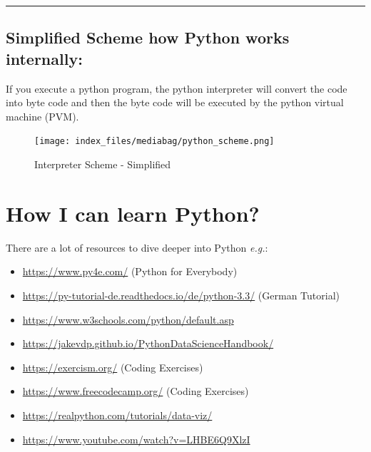 \documentclass[
  letterpaper,
  DIV=11,
  numbers=noendperiod]{scrreprt}
\providecommand{\tightlist}{%
  \setlength{\itemsep}{0pt}\setlength{\parskip}{0pt}}\usepackage{longtable,booktabs,array}
\begin{document}
\begin{center}\rule{0.5\linewidth}{0.5pt}\end{center}

\subsection*{Simplified Scheme how Python works
internally:}\label{simplified-scheme-how-python-works-internally}

If you execute a python program, the python interpreter will convert the
code into byte code and then the byte code will be executed by the
python virtual machine (PVM).

\begin{figure}[H]

{\centering \texttt{[image: index\_files/mediabag/python\_scheme.png]}

}

\caption{Interpreter Scheme - Simplified}

\end{figure}%

\section*{How I can learn Python?}\label{how-i-can-learn-python}


There are a lot of resources to dive deeper into Python \emph{e.g.}:

\begin{itemize}
\tightlist
\item
  \url{https://www.py4e.com/} (Python for Everybody)
\item
  \url{https://py-tutorial-de.readthedocs.io/de/python-3.3/} (German
  Tutorial)
\item
  \url{https://www.w3schools.com/python/default.asp}
\item
  \url{https://jakevdp.github.io/PythonDataScienceHandbook/}
\item
  \url{https://exercism.org/} (Coding Exercises)
\item
  \url{https://www.freecodecamp.org/} (Coding Exercises)
\item
  \url{https://realpython.com/tutorials/data-viz/}
\item
  \url{https://www.youtube.com/watch?v=LHBE6Q9XlzI}
\end{itemize}
\end{document}
